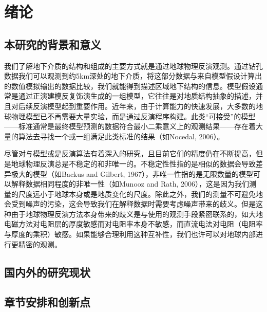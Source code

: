 \cleardoublepage

\section{绪论}

\subsection{本研究的背景和意义}

我们了解地下介质的结构和组成的主要方式就是通过地球物理反演观测。通过钻孔数据我们可以观测到约5km深处的地下介质，将这部分数据与来自模型假设计算出的数值模拟输出的数据比较，我们就能得到描述区域地下结构的信息。模型假设通常是通过正演建模反复饰演生成的一组模型，它往往是对地质结构抽象的描述，并且对后续反演模型起到重要作用。近年来，由于计算能力的快速发展，大多数的地球物理模型已不再需要大量实验，而是通过反演程序构建。此类“可接受”的模型——标准通常是最终模型预测的数据符合最小二乘意义上的观测结果——存在着大量的算法去寻找一个或一组满足此类标准的结果（如Nocedal, 2006）。

尽管对与模型或是反演算法有着深入的研究，且目前它们的精度仍在不断提高，但是地球物理反演总是不稳定的和非唯一的。不稳定性性指的是相似的数据会导致差异极大的模型（如Backus and Gilbert, 1967），非唯一性指的是无限数量的模型可以解释数据相同程度的非唯一性（如Munooz and Rath, 2006），这是因为我们测量的尺度远小于地球本身或是地质变化的尺度。除此之外，我们的测量不可避免地会受到噪声的污染，这会导致我们在解释数据时需要考虑噪声带来的歧义。但是这种由于地球物理反演方法本身带来的歧义是与使用的观测手段紧密联系的，如大地电磁方法对电阻层的厚度敏感而对电阻率本身不敏感，而直流电法对电阻（电阻率与厚度的乘积）敏感。如果能够合理利用这种互补性，我们也许可以对地球内部进行更精密的观测。\cite{杨博2021基于聚类和多元地质统计学的电}

\subsection{国内外的研究现状}


\subsection{章节安排和创新点}

